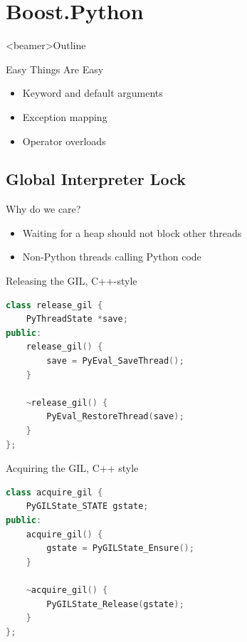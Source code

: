 \documentclass{beamer}
\begin{document}
\section{Boost.Python}

\begin{frame}<beamer>{Outline}
  \tableofcontents[currentsection]
\end{frame}

\begin{frame}{Easy Things Are Easy}
  \begin{itemize}
    \item Keyword and default arguments
    \item Exception mapping
    \item Operator overloads
  \end{itemize}
\end{frame}

\subsection[GIL]{Global Interpreter Lock}

\begin{frame}{Why do we care?}
  \begin{itemize}
    \item Waiting for a heap should not block other threads
    \item Non-Python threads calling Python code
  \end{itemize}
\end{frame}

\begin{frame}[fragile=singleslide]{Releasing the GIL, C++-style}
  \begin{lstlisting}[language=c++]
class release_gil {
    PyThreadState *save;
public:
    release_gil() {
        save = PyEval_SaveThread();
    }

    ~release_gil() {
        PyEval_RestoreThread(save);
    }
};
  \end{lstlisting}
\end{frame}

\begin{frame}[fragile=singleslide]{Acquiring the GIL, C++ style}
  \begin{lstlisting}[language=c++]
class acquire_gil {
    PyGILState_STATE gstate;
public:
    acquire_gil() {
        gstate = PyGILState_Ensure();
    }

    ~acquire_gil() {
        PyGILState_Release(gstate);
    }
};
  \end{lstlisting}
\end{frame}
\end{document}
